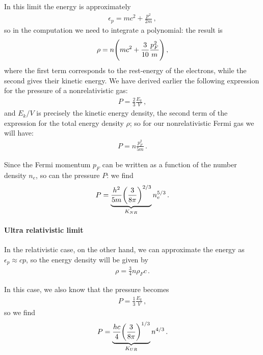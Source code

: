 \documentclass[main.tex]{subfiles}
\begin{document}
In this limit the energy is approximately
%
\begin{align}
  \epsilon _p = mc^2 + \frac{p^2}{2m}
\,,
\end{align}
%
so in the computation we need to integrate a polynomial: the result is
%
\begin{align}
  \rho = n \qty(mc^2 + \frac{3}{10} \frac{p_F^2}{m})
\,,
\end{align}
%
where the first term corresponds to the rest-energy of the electrons, while the second gives their kinetic energy.
We have derived earlier the following expression for the pressure of a nonrelativistic gas:
%
\begin{align}
  P  = \frac{2}{3} \frac{E_k}{V}
\,,
\end{align}
%
and \(E_k / V\) is precisely the kinetic energy density, the second term of the expression for the total energy density \(\rho \); 
so for our nonrelativistic Fermi gas we will have:
%
\begin{align}
  P = n \frac{p_F^2}{5m} 
\,.
\end{align}

Since the Fermi momentum \(p_F\) can be written as a function of the number density \(n_e\), so can the pressure \(P\): we find 
%
\begin{align}
P = \underbrace{\frac{h^2}{5m} \qty(\frac{3}{8 \pi })^{2/3}}_{K_{NR}} n_e^{5/3}
\,.
\end{align}

\paragraph{Ultra relativistic limit}

%

In the relativistic case, on the other hand, we can approximate the energy as \(\epsilon _p \approx cp\), so the energy density will be given by 
%
\begin{align}
\rho = \frac{3}{4} n \rho _F c
\,.
\end{align}

In this case, we also know that the pressure becomes 
%
\begin{align}
  P = \frac{1}{3} \frac{E_k}{V}
\,,
\end{align}
%
so we find 
%
\begin{align}
P = \underbrace{\frac{hc}{4} \qty(\frac{3}{8 \pi })^{1/3}}_{K_{UR}} n^{4/3} 
\,.
\end{align}
\end{document}
